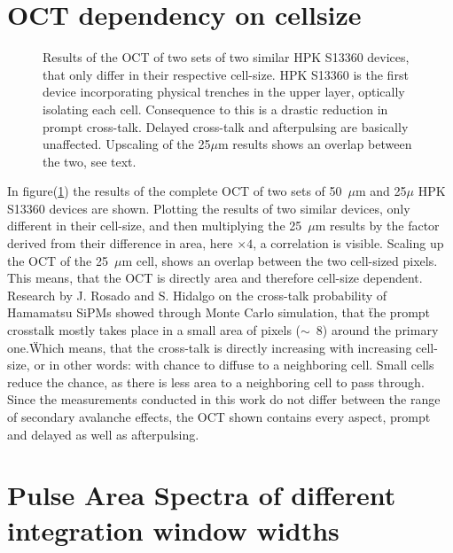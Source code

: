 \documentclass[12pt,article,type=msc,colorback,accentcolor=tud9c]{tudthesis}
\begin{document}
\clearpage
\section{OCT dependency on cellsize}
\label{appsec:OCT_Size}
\begin{figure}[h]
\begin{centering}
\caption[OCT dependency on the cell-size]{Results of the OCT of two sets of two similar HPK S13360 devices, that only differ in their respective cell-size. HPK S13360 is the first device incorporating physical trenches in the upper layer, optically isolating each cell. Consequence to this is a drastic reduction in prompt cross-talk. Delayed cross-talk and afterpulsing are basically unaffected. Upscaling of the 25$\mu$m results shows an overlap between the two, see text.}
\label{fig:cell-size}
\end{centering}
\end{figure}
In figure(\ref{fig:cell-size}) the results of the complete OCT of two sets of 50~$\mu$m and 25$\mu$ HPK S13360 devices are shown. Plotting the results of two similar devices, only different in their cell-size, and then multiplying the 25~$\mu$m results by the factor derived from their difference in area, here $\times 4$, a correlation is visible. Scaling up the OCT of the 25~$\mu$m cell, shows an overlap between the two cell-sized pixels. This means, that the OCT is directly area and therefore cell-size dependent. Research by J. Rosado and S. Hidalgo \cite{ModelCTAP} on the cross-talk probability of Hamamatsu SiPMs showed through Monte Carlo simulation, that \"the prompt crosstalk mostly takes place in a small area of pixels ($\sim$~8) around the primary one.\" Which means, that the cross-talk is directly increasing with increasing cell-size, or in other words: with chance to diffuse to a neighboring cell. Small cells reduce the chance, as there is less area to a neighboring cell to pass through.\\
Since the measurements conducted in this work do not differ between the range of secondary avalanche effects, the OCT shown contains every aspect, prompt and delayed as well as afterpulsing.

\clearpage
\section{Pulse Area Spectra of different integration window widths}
\label{appsec:PAS_window}
\end{document}
